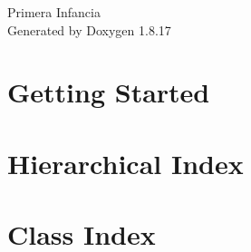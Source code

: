 \let\mypdfximage\pdfximage\def\pdfximage{\immediate\mypdfximage}\documentclass[twoside]{book}
\newcommand{\+}{\discretionary{\mbox{\scriptsize$\hookleftarrow$}}{}{}}
\newcommand{\clearemptydoublepage}{%
  \newpage{\pagestyle{empty}\cleardoublepage}%
}
\begin{document}
\begin{titlepage}
\vspace*{7cm}
\begin{center}%
{\Large Primera Infancia }\\
\vspace*{1cm}
{\large Generated by Doxygen 1.8.17}\\
\end{center}
\end{titlepage}
\clearemptydoublepage
{}
\tableofcontents
\clearemptydoublepage
{}

\chapter{Getting Started}
\label{md__home_sole__sole__primera_infancia_primera_infancia_rest__h_e_l_p}

\chapter{Hierarchical Index}

\chapter{Class Index}

\end{document}
